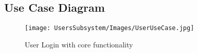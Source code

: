 \begin{figure}[H]
\end{figure}




\subsection{Use Case Diagram}

\begin{figure}[H]
		\centering
		\texttt{[image: UsersSubsystem/Images/UserUseCase.jpg]}
		\caption{User Login with core functionality }
\end{figure}



